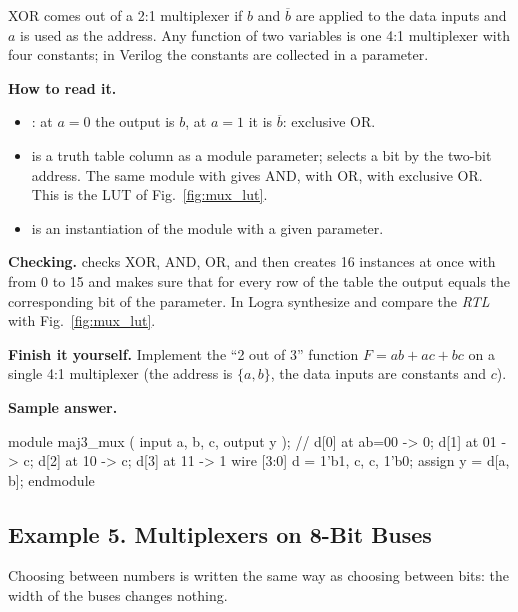 XOR comes out of a 2:1 multiplexer if $b$ and $\overline{b}$ are applied to the
data inputs and $a$ is used as the address. Any function of two variables is one
4:1 multiplexer with four constants; in Verilog the constants are collected in a
parameter.


\textbf{How to read it.}
\begin{itemize}
  \item {}: at $a=0$ the output is $b$, at $a=1$ it is $\overline b$: exclusive OR.
  \item {} is a truth table column as a module parameter;  selects a bit by the two-bit address. The same module with  gives AND, with  OR, with  exclusive OR. This is the LUT of Fig.~\ref{fig:mux_lut}.
  \item {} is an instantiation of the module with a given parameter.
\end{itemize}
\textbf{Checking.}  checks XOR, AND, OR, and then creates
16 instances at once with  from 0 to 15 and makes sure that for every
row of the table the output equals the corresponding bit of the parameter. In
Logra synthesize  and compare the \emph{RTL} with
Fig.~\ref{fig:mux_lut}.

\textbf{Finish it yourself.} Implement the ``2 out of 3'' function
$F=ab+ac+bc$ on a single 4:1 multiplexer (the address is $\{a,b\}$, the data
inputs are constants and $c$).

\textbf{Sample answer.}
\begin{vcode}
module maj3_mux (
    input  a, b, c,
    output y
);
    // d[0] at ab=00 -> 0;  d[1] at 01 -> c;  d[2] at 10 -> c;  d[3] at 11 -> 1
    wire [3:0] d = {1'b1, c, c, 1'b0};
    assign y = d[{a, b}];
endmodule
\end{vcode}

\subsection{Example 5. Multiplexers on 8-Bit Buses}

Choosing between numbers is written the same way as choosing between bits: the
width of the buses changes nothing.


